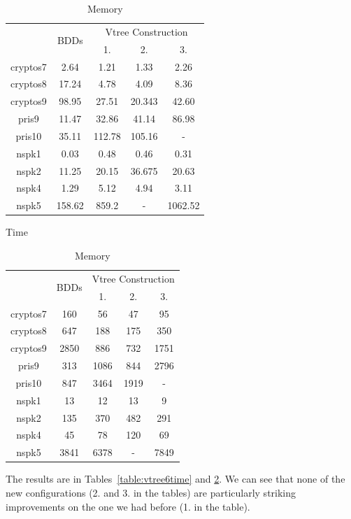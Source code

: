 \documentclass[11pt]{article}
\begin{document}
\begin{table}
\centering
\begin{tabular}{|*{5}{c|}}
\hline
& \multirow{2}{*}{BDDs} & \multicolumn{3}{c|}{Vtree Construction} \\ \cline{3-5}
& & 1. & 2. & 3.\\ \hline
cryptos7 & 2.64 &  1.21& 1.33 & 2.26 \\\hline
cryptos8 & 17.24&  4.78& 4.09 & 8.36 \\\hline
cryptos9 & 98.95 &27.51 & 20.343 & 42.60 \\\hline
pris9 & 11.47&32.86 & 41.14 & 86.98\\\hline
pris10 & 35.11&112.78& 105.16 & -\\\hline
nspk1 & 0.03 &0.48  & 0.46 & 0.31 \\\hline
nspk2 & 11.25 &  20.15& 36.675 & 20.63 \\\hline
nspk4 & 1.29 & 5.12& 4.94 & 3.11 \\\hline
nspk5 & 158.62 &859.2 & - & 1062.52\\\hline
\end{tabular}
\caption{Time}
\label{table:vtree6time}
\vspace{1in}
\begin{tabular}{|*{5}{c|}}
\hline
& \multirow{2}{*}{BDDs} & \multicolumn{3}{c|}{Vtree Construction} \\  \cline{3-5}
& & 1. & 2. & 3.\\ \hline
cryptos7 & 160 & 56 & 47 & 95 \\\hline
cryptos8 & 647 & 188 & 175& 350 \\\hline
cryptos9 & 2850 & 886 & 732 & 1751 \\\hline
pris9 & 313 & 1086 & 844& 2796 \\\hline
pris10 & 847 & 3464 & 1919 & - \\\hline
nspk1 & 13 & 12& 13 & 9 \\\hline
nspk2 & 135 & 370 & 482 & 291 \\\hline
nspk4 & 45 & 78  & 120 & 69 \\\hline
nspk5 & 3841 & 6378 & - & 7849 \\\hline
\end{tabular}
\caption{Memory}
\label{table:vtree6memory}
\end{table}

The results are in Tables~\ref{table:vtree6time} and \ref{table:vtree6memory}. We can see that none of the new configurations (2. and 3. in the tables) are particularly striking improvements on the one we had before (1. in the table). 
\end{document}
